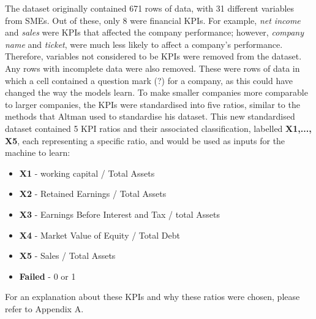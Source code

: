 \documentclass[11pt]{article}
\begin{document}
The dataset originally contained 671 rows of data, with 31 different variables from SMEs. Out of these, only 8 were financial KPIs. For example, \textit{net income} and \textit{sales} were KPIs that affected the company performance; however, \textit{company name} and \textit{ticket}, were much less likely to affect a company's performance. Therefore, variables not considered to be KPIs were removed from the dataset. Any rows with incomplete data were also removed. These were rows of data in which a cell contained a question mark (?) for a company, as this could have changed the way the models learn. To make smaller companies more comparable to larger companies, the KPIs were standardised into five ratios, similar to the methods that Altman used to standardise his dataset. This new standardised dataset contained 5 KPI ratios and their associated classification, labelled \textbf{X1,..., X5}, each representing a specific ratio, and would be used as inputs for the machine to learn:
\begin{center}
	\begin{minipage}{.6\textwidth}
		\begin{itemize}
			\item[] \textbf{X1} - working capital / Total Assets
			\item[] \textbf{X2} - Retained Earnings / Total Assets
			\item[] \textbf{X3} - Earnings Before Interest and Tax / total Assets
			\item[] \textbf{X4} - Market Value of Equity / Total Debt
			\item[] \textbf{X5} - Sales / Total Assets
			\item[] \textbf{Failed} - 0 or 1
		\end{itemize}
	\end{minipage}
\end{center}
For an explanation about these KPIs and why these ratios were chosen, please refer to Appendix A.
\end{document}
